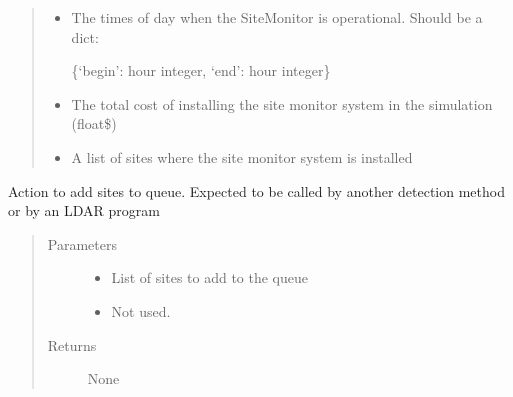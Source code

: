 \documentclass[letterpaper,10pt,english]{sphinxmanual}
\begin{document}
\begin{fulllineitems}
\begin{quote}
\begin{description}
\begin{itemize}
\item {} 
 \textendash{} 
The times of day when the SiteMonitor is operational. Should be a dict:

\{‘begin’: hour integer, ‘end’: hour integer\}


\item {} 
 \textendash{} The total cost of installing the site monitor system in the simulation (float\textendash{}\$)

\item {} 
 \textendash{} A list of sites where the site monitor system is installed

\end{itemize}

\end{description}\end{quote}

\begin{fulllineitems}
\label{\detokenize{index:feast.DetectionModules.site_monitor.SiteMonitor.action}}
Action to add sites to queue. Expected to be called by another detection method or by an LDAR program
\begin{quote}\begin{description}
\item[{Parameters}] \leavevmode\begin{itemize}
\item {} 
 \textendash{} List of sites to add to the queue

\item {} 
 \textendash{} Not used.

\end{itemize}

\item[{Returns}] \leavevmode
None

\end{description}\end{quote}

\end{fulllineitems}



\end{fulllineitems}
\end{document}

